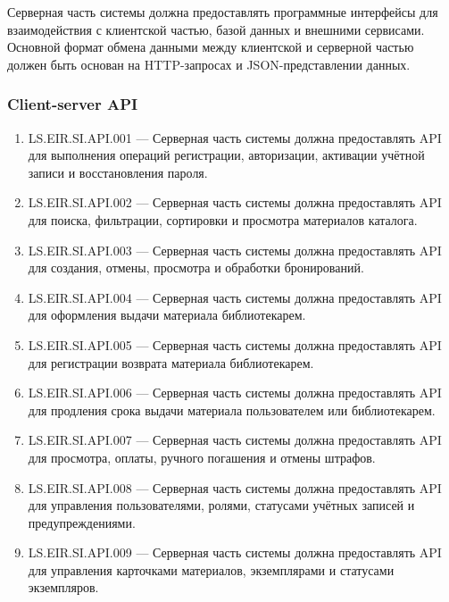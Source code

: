\documentclass[12pt,a4paper]{article}
\begin{document}
	Серверная часть системы должна предоставлять программные интерфейсы для
	взаимодействия с клиентской частью, базой данных и внешними сервисами. Основной
	формат обмена данными между клиентской и серверной частью должен быть основан
	на HTTP-запросах и JSON-представлении данных.
	
	\subsubsection{Client-server API}
	
	\begin{enumerate}
		\item LS.EIR.SI.API.001 --- Серверная часть системы должна предоставлять API
		для выполнения операций регистрации, авторизации, активации учётной записи
		и восстановления пароля.
		
		\item LS.EIR.SI.API.002 --- Серверная часть системы должна предоставлять API
		для поиска, фильтрации, сортировки и просмотра материалов каталога.
		
		\item LS.EIR.SI.API.003 --- Серверная часть системы должна предоставлять API
		для создания, отмены, просмотра и обработки бронирований.
		
		\item LS.EIR.SI.API.004 --- Серверная часть системы должна предоставлять API
		для оформления выдачи материала библиотекарем.
		
		\item LS.EIR.SI.API.005 --- Серверная часть системы должна предоставлять API
		для регистрации возврата материала библиотекарем.
		
		\item LS.EIR.SI.API.006 --- Серверная часть системы должна предоставлять API
		для продления срока выдачи материала пользователем или библиотекарем.
		
		\item LS.EIR.SI.API.007 --- Серверная часть системы должна предоставлять API
		для просмотра, оплаты, ручного погашения и отмены штрафов.
		
		\item LS.EIR.SI.API.008 --- Серверная часть системы должна предоставлять API
		для управления пользователями, ролями, статусами учётных записей и
		предупреждениями.
		
		\item LS.EIR.SI.API.009 --- Серверная часть системы должна предоставлять API
		для управления карточками материалов, экземплярами и статусами экземпляров.
		

\end{enumerate}
\end{document}
